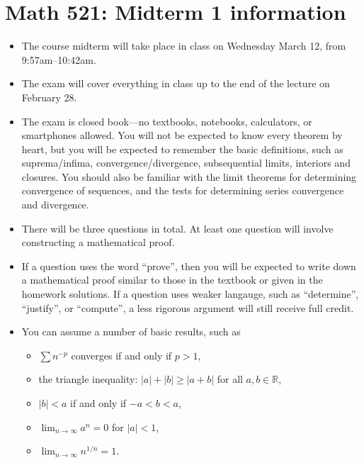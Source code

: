 \documentclass[12pt]{article}
\newcommand{\R}{\mathbb{R}}
\begin{document}
\section*{Math 521: Midterm 1 information}
\begin{itemize}
  \item The course midterm will take place in class on Wednesday March 12,
    from 9:57am--10:42am.
  \item The exam will cover everything in class up to the end of the lecture on
    February 28.
  \item The exam is closed book---no textbooks, notebooks, calculators,
    or smartphones allowed. You will not be expected to know every theorem by
    heart, but you will be expected to remember the basic definitions, such as
    suprema/infima, convergence/divergence, subsequential limits, interiors and
    closures. You should also be familiar with the limit theorems for
    determining convergence of sequences, and the tests for determining series
    convergence and divergence. 
  \item There will be three questions in total. At least one question will
    involve constructing a mathematical proof.
  \item If a question uses the word ``prove'', then you will be expected to
    write down a mathematical proof similar to those in the textbook or given in
    the homework solutions. If a question uses weaker langauge, such as
    ``determine'', ``justify'', or ``compute'', a less rigorous argument will
    still receive full credit.
  \item You can assume a number of basic results, such as
    \begin{itemize}
      \item $\sum n^{-p}$ converges if and only if $p>1$,
      \item the triangle inequality: $|a|+|b|\ge |a+b|$ for all $a,b\in \R$,
      \item $|b|<a$ if and only if $-a<b<a$,
      \item $\lim_{n\to \infty} a^n= 0$ for $|a|<1$,
      \item $\lim_{n\to \infty} n^{1/n} = 1$.
    \end{itemize}
\end{itemize}
\end{document}
